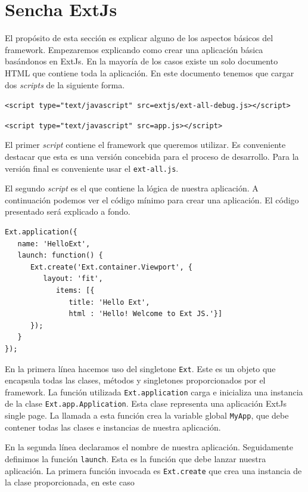 \section{Sencha ExtJs}
	El propósito de esta sección es explicar alguno de los aspectos básicos del framework. Empezaremos explicando como crear una aplicación básica
	basándonos en ExtJs. En la mayoría de los casos existe un solo documento HTML\cite{HTML} que contiene toda la aplicación. En este documento
	tenemos que cargar dos \emph{scripts} de la siguiente forma.
    		\begin{center} \texttt{<script type="text/javascript" src=\textquotedbl extjs/ext-all-debug.js\textquotedbl ></script>}  \end{center}
    		\begin{center} \texttt{<script type="text/javascript" src=\textquotedbl app.js\textquotedbl ></script>}  \end{center}
 	El primer \emph{script} contiene el framework que queremos utilizar. Es conveniente destacar que esta es una versión concebida para el proceso
	de desarrollo. Para la versión final es conveniente usar el \texttt{ext-all.js}.
 	\par
 	El segundo \emph{script} es el que contiene la lógica de nuestra aplicación. A continuación podemos ver el código mínimo para crear una
	aplicación. El código presentado será explicado a fondo.
	\begin{lstlisting}
Ext.application({
   name: 'HelloExt',
   launch: function() {
      Ext.create('Ext.container.Viewport', {
         layout: 'fit',
            items: [{
               title: 'Hello Ext',
               html : 'Hello! Welcome to Ext JS.'}] 
      }); 
   } 
});
	\end{lstlisting}
 	En la primera línea hacemos uso del singletone \texttt{Ext}. Este es un objeto que encapsula todas las clases, métodos y singletones
	proporcionados por el framework. La función utilizada \texttt{Ext.application} carga e inicializa una instancia de la clase
	\texttt{Ext.app.Application}. Esta clase representa una aplicación ExtJs single page. La llamada a esta función crea la variable global
	\texttt{MyApp}, que debe contener todas las clases e instancias de nuestra aplicación.
 	\par
 	En la segunda línea declaramos el nombre de nuestra aplicación. Seguidamente definimos la función \texttt{launch}. Esta es la función que debe
	lanzar  nuestra aplicación. La primera función invocada es \texttt{Ext.create} que crea una instancia de la clase proporcionada, en este caso
